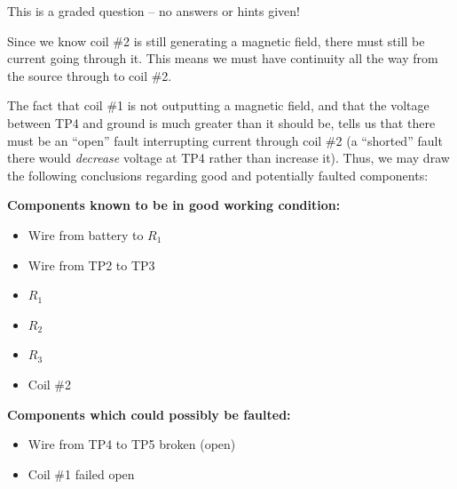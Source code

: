 \vfil 

\eject






This is a graded question -- no answers or hints given!







Since we know coil \#2 is still generating a magnetic field, there must still be current going through it.  This means we must have continuity all the way from the source through to coil \#2.

\vskip 10pt

The fact that coil \#1 is not outputting a magnetic field, and that the voltage between TP4 and ground is much greater than it should be, tells us that there must be an ``open'' fault interrupting current through coil \#2 (a ``shorted'' fault there would {\it decrease} voltage at TP4 rather than increase it).  Thus, we may draw the following conclusions regarding good and potentially faulted components:

\vskip 10pt

\goodbreak
\noindent
{\bf Components known to be in good working condition:}

\begin{itemize}
\item{} Wire from battery to $R_1$
\item{} Wire from TP2 to TP3
\item{} $R_1$
\item{} $R_2$
\item{} $R_3$
\item{} Coil \#2
\end{itemize}

\vskip 10pt

\goodbreak
\noindent
{\bf Components which could possibly be faulted:}

\begin{itemize}
\item{} Wire from TP4 to TP5 broken (open)
\item{} Coil \#1 failed open
\end{itemize}




